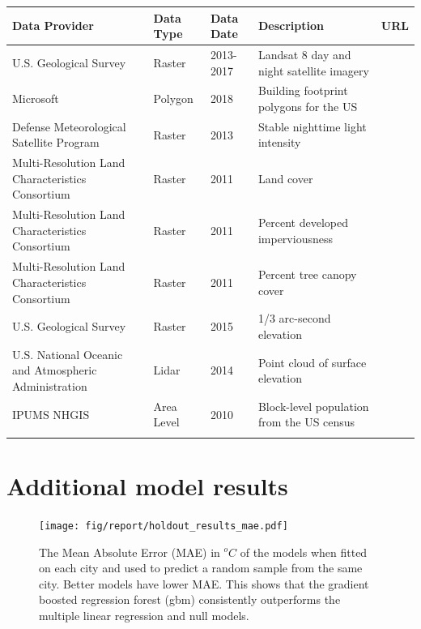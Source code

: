 \documentclass[]{elsarticle}
\begin{document}
\begin{tabu}to \textwidth{ X[l]  X[c]  X[c] X[l] X[l] }
 \hline
 Data Provider & Data Type & Data Date & Description & URL \\
 \hline
U.S. Geological Survey  & Raster  & 2013-2017 &
    Landsat 8 day and night satellite imagery &  \\
Microsoft  & Polygon  & 2018 & Building footprint polygons for the US &
     \\
Defense Meteorological Satellite Program  & Raster  & 2013 &
    Stable nighttime light intensity &  \\
Multi-Resolution Land Characteristics Consortium  & Raster  & 2011 &
    Land cover &  \\
Multi-Resolution Land Characteristics Consortium  & Raster  & 2011 &
    Percent developed imperviousness &  \\
Multi-Resolution Land Characteristics Consortium  & Raster  & 2011 &
    Percent tree canopy cover &  \\
U.S. Geological Survey  & Raster  & 2015 & 1/3 arc-second elevation &
     \\
U.S. National Oceanic and Atmospheric Administration  & Lidar  & 2014 & Point cloud of surface elevation &
     \\
IPUMS NHGIS  & Area Level  & 2010 &
    Block-level population from the US census & \cite{nhgis}\\
\hline
\label{tab:data}
\end{tabu}




\section{Additional model results}
\begin{figure}[h]
\begin{center}
\texttt{[image: fig/report/holdout\_results\_mae.pdf]}
\caption{The Mean Absolute Error (MAE) in $^oC$ of the models when fitted on each city and used to predict a random sample from the same city. Better models have lower MAE. This shows that the gradient boosted regression forest (gbm) consistently outperforms the multiple linear regression and null models. }
\label{fig:cityholdout_errors}
\end{center}
\end{figure}
\end{document}
